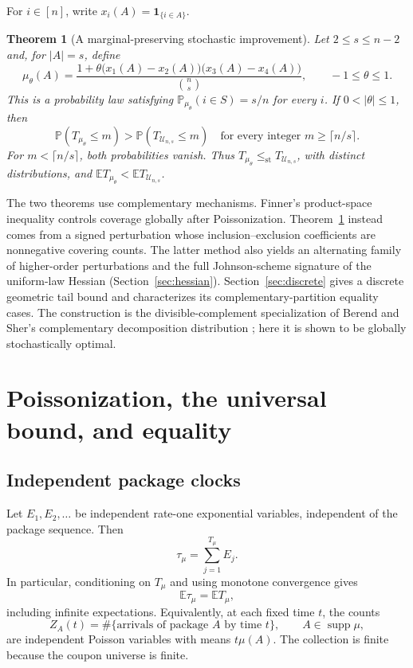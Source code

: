 \documentclass[11pt]{article}
\numberwithin{equation}{section}
\newtheorem{theorem}{Theorem}[section]
\theoremstyle{remark}
\newcommand{\Pp}{\mathbb P}
\newcommand{\E}{\mathbb E}
\newcommand{\1}{\mathbf 1}
\newcommand{\supp}{\operatorname{supp}}
\newcommand{\st}{\leq_{\mathrm{st}}}
\newcommand{\U}{\mathcal U}
\begin{document}
For $i\in[n]$, write $x_i(A)=\1_{\{i\in A\}}$.

\begin{theorem}[A marginal-preserving stochastic improvement]\label{thm:main-schilling}
Let $2\leq s\leq n-2$ and, for $|A|=s$, define
\begin{equation}\label{eq:four-switch}
 \mu_\theta(A)=\frac{1+\theta\bigl(x_1(A)-x_2(A)\bigr)
                         \bigl(x_3(A)-x_4(A)\bigr)}{\binom ns},
 \qquad -1\leq\theta\leq1.
\end{equation}
This is a probability law satisfying $\Pp_{\mu_\theta}(i\in S)=s/n$ for every $i$. If $0<|\theta|\leq1$, then
\begin{equation}\label{eq:schilling-fixed}
 \Pp(T_{\mu_\theta}\leq m)>
 \Pp(T_{\U_{n,s}}\leq m)
 \quad\text{for every integer }m\geq\lceil n/s\rceil.
\end{equation}
For $m<\lceil n/s\rceil$, both probabilities vanish. Thus
$T_{\mu_\theta}\st T_{\U_{n,s}}$, with distinct distributions, and
$\E T_{\mu_\theta}<\E T_{\U_{n,s}}$.
\end{theorem}

The two theorems use complementary mechanisms. Finner's product-space inequality \cite{Finner} controls coverage globally after Poissonization. Theorem~\ref{thm:main-schilling} instead comes from a signed perturbation whose inclusion--exclusion coefficients are nonnegative covering counts. The latter method also yields an alternating family of higher-order perturbations and the full Johnson-scheme signature of the uniform-law Hessian (Section~\ref{sec:hessian}). Section~\ref{sec:discrete} gives a discrete geometric tail bound and characterizes its complementary-partition equality cases. The construction is the divisible-complement specialization of Berend and Sher's complementary decomposition distribution \cite[Section~2]{BerendSher}; here it is shown to be globally stochastically optimal.

\section{Poissonization, the universal bound, and equality}\label{sec:poisson}

\subsection{Independent package clocks}

Let $E_1,E_2,\ldots$ be independent rate-one exponential variables, independent of the package sequence. Then
\begin{equation}\label{eq:clock-sum}
 \tau_\mu=\sum_{j=1}^{T_\mu} E_j.
\end{equation}
In particular, conditioning on $T_\mu$ and using monotone convergence gives
\begin{equation}\label{eq:mean-poissonization}
 \E\tau_\mu=\E T_\mu,
\end{equation}
including infinite expectations. Equivalently, at each fixed time $t$, the counts
\[
 Z_A(t)=\#\{\text{arrivals of package }A\text{ by time }t\},
 \qquad A\in\supp\mu,
\]
are independent Poisson variables with means $t\mu(A)$. The collection is finite because the coupon universe is finite.
\end{document}
